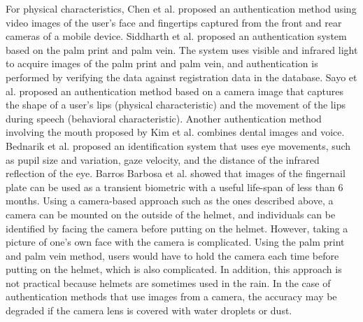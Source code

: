 \documentclass[english,preprint,JIP]{ipsj}
\begin{document}
For physical characteristics, Chen et al.\cite{face_and_finger} proposed an authentication method using video images of the user's face and fingertips captured from the front and rear cameras of a mobile device. Siddharth et al.\cite{palm_print} proposed an authentication system based on the palm print and palm vein. The system uses visible and infrared light to acquire images of the palm print and palm vein, and authentication is performed by verifying the data against registration data in the database. Sayo et al.\cite{lip_motion} proposed an authentication method based on a camera image that captures the shape of a user's lips (physical characteristic) and the movement of the lips during speech (behavioral characteristic). Another authentication method involving the mouth proposed by Kim et al.\cite{teeth_and_voice} combines dental images and voice. Bednarik et al.\cite{eye_movement} proposed an identification system that uses eye movements, such as pupil size and variation, gaze velocity, and the distance of the infrared reflection of the eye. Barros Barbosa et al.\cite{nail_auth} showed that images of the fingernail plate can be used as a transient biometric with a useful life-span of less than 6 months. Using a camera-based approach such as the ones described above, a camera can be mounted on the outside of the helmet, and individuals can be identified by facing the camera before putting on the helmet. However, taking a picture of one's own face with the camera is complicated. Using the palm print and palm vein method, users would have to hold the camera each time before putting on the helmet, which is also complicated. In addition, this approach is not practical because helmets are sometimes used in the rain. In the case of authentication methods that use images from a camera, the accuracy may be degraded if the camera lens is covered with water droplets or dust.\par
\end{document}
